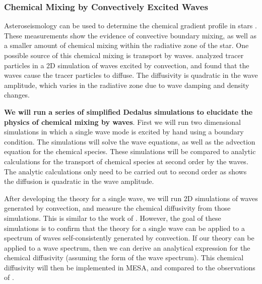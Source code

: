 {\color{purple}
\subsubsection{Chemical Mixing by Convectively Excited Waves}
}
\label{sec:wave mixing}

Asteroseismology can be used to determine the chemical gradient profile in stars \citep{Ghasemi_2016}. These measurements show the evidence of convective boundary mixing, as well as a smaller amount of chemical mixing within the radiative zone of the star. One possible source of this chemical mixing is transport by waves. \citet{Rogers2017} analyzed tracer particles in a 2D simulation of waves excited by convection, and found that the waves cause the tracer particles to diffuse. The diffusivity is quadratic in the wave amplitude, which varies in the radiative zone due to wave damping and density changes.

\textbf{We will run a series of simplified Dedalus simulations to elucidate the physics of chemical mixing by waves}. First we will run two dimensional simulations in which a single wave mode is excited by hand using a boundary condition. The simulations will solve the wave equations, as well as the advection equation for the chemical species. These simulations will be compared to analytic calculations for the transport of chemical species at second order by the waves. The analytic calculations only need to be carried out to second order as \citet{Rogers2017} shows the diffusion is quadratic in the wave amplitude.

After developing the theory for a single wave, we will run 2D simulations of waves generated by convection, and measure the chemical diffusivity from those simulations. This is similar to the work of \citet{Rogers2017}. However, the goal of these simulations is to confirm that the theory for a single wave can be applied to a spectrum of waves self-consistently generated by convection. If our theory can be applied to a wave spectrum, then we can derive an analytical expression for the chemical diffusivity (assuming the form of the wave spectrum). This chemical diffusivity will then be implemented in MESA, and compared to the observations of \citep{Ghasemi_2016}.
